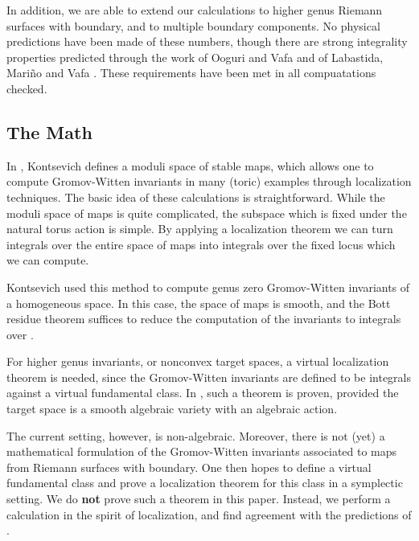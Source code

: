 \documentclass[a4paper,11pt]{article}
\providecommand{\C}{\mathbb{C}}
\providecommand{\M}{\overline{M}}
\begin{document}
In addition, we are able to extend our calculations to higher
genus Riemann surfaces with boundary, and to multiple
boundary components.  No physical predictions
have been made of these numbers, though there are
strong integrality properties predicted through the
work of Ooguri and Vafa \cite{OV}
and of Labastida, Mari\~no and Vafa \cite{LMV}.  These
requirements have been met in all compuatations checked.

\subsection{The Math}

In \cite{Kont},
Kontsevich defines a moduli space of stable maps,
which allows one to compute Gromov-Witten invariants
in many (toric) examples through
localization techniques.  The basic idea
of these calculations is straightforward.  While the
moduli space of maps is quite complicated, the
subspace which is fixed under the natural
torus action is simple.  By applying a localization
theorem we can turn integrals over the entire
space of maps into integrals over the fixed
locus which we can compute.

Kontsevich used this method to 
compute genus zero Gromov-Witten
invariants of a homogeneous space.  In this
case, the space of maps is smooth, and the
Bott residue theorem suffices to reduce the
computation of the invariants to integrals over
\myHighlight{$\M_{0,n}$}\coordHE{}.

For higher genus invariants, or nonconvex target
spaces, a virtual localization theorem is needed,
since the Gromov-Witten invariants 
are defined to be integrals against a
virtual fundamental class.
In \cite{GP}, such a theorem is proven, provided
the target space is a smooth algebraic variety with
an algebraic \myHighlight{$\C^*$}\coordHE{} action.

The current setting, however, is non-algebraic.
Moreover, there is not (yet) a mathematical formulation
of the Gromov-Witten invariants associated to maps
from Riemann surfaces with boundary.
One then hopes to define a virtual fundamental
class and prove a localization theorem for
this class in 
a symplectic setting.
We do {\bf not} prove such a theorem in this paper.
Instead, we perform a calculation in the spirit of
localization, and find agreement with the
predictions of \cite{AKV}.
\end{document}

